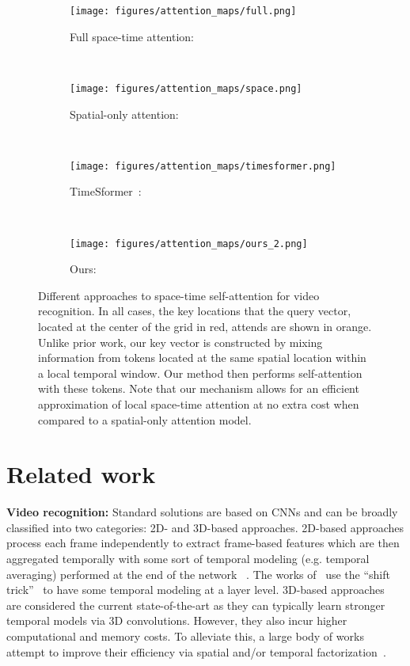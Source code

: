 \documentclass{article}
\begin{document}
\begin{figure}
    \centering
    \begin{subfigure}[t]{0.23\textwidth}
        \centering
        \texttt{[image: figures/attention\_maps/full.png]}
        \caption{Full space-time attention: }
    \end{subfigure}
    ~
     \begin{subfigure}[t]{0.23\textwidth}
    \centering
        \texttt{[image: figures/attention\_maps/space.png]}
        \caption{Spatial-only attention: }
    \end{subfigure}
     ~
    \begin{subfigure}[t]{0.23\textwidth}
        \centering
        \texttt{[image: figures/attention\_maps/timesformer.png]}
        \caption{TimeSformer~\citep{bertasius2021space}: }
    \end{subfigure} 
    ~
    \begin{subfigure}[t]{0.23\textwidth}
    \centering
        \texttt{[image: figures/attention\_maps/ours\_2.png]}
        \caption{Ours: }
    \end{subfigure}
    \caption{Different approaches to space-time self-attention for video recognition. In all cases, the key locations that the query vector, located at the center of the grid in red, attends are shown in orange. Unlike prior work, our key vector is constructed by mixing information from tokens located at the same spatial location within a local temporal window. Our method then performs self-attention with these tokens. Note that our mechanism allows for an efficient approximation of local space-time attention at no extra cost when compared to a spatial-only attention model.}
    \label{fig:overall_idea}
    \vspace*{-0.4cm}
\end{figure}

\section{Related work}

\textbf{Video recognition:} Standard solutions are based on CNNs and can be broadly classified into two categories: 2D- and 3D-based approaches. 2D-based approaches process each frame independently to extract frame-based features which are then aggregated temporally with some sort of temporal modeling (e.g. temporal averaging) performed at the end of the network ~\citep{wang2018temporal,lin2019tsm,liu2020tam}. The works of~\citep{lin2019tsm,liu2020tam} use the ``shift trick''~\citep{wu2018shift} to have some temporal modeling at a layer level. 3D-based approaches~\citep{carreira2017quo,feichtenhofer2019slowfast,tran2015learning} are considered the current state-of-the-art as they can typically learn stronger temporal models via 3D convolutions. However, they also incur higher computational and memory costs. To alleviate this, a large body of works attempt to improve their efficiency via spatial and/or temporal factorization~\citep{tran2019video,tran2018closer,feichtenhofer2020x3d}.
\end{document}
